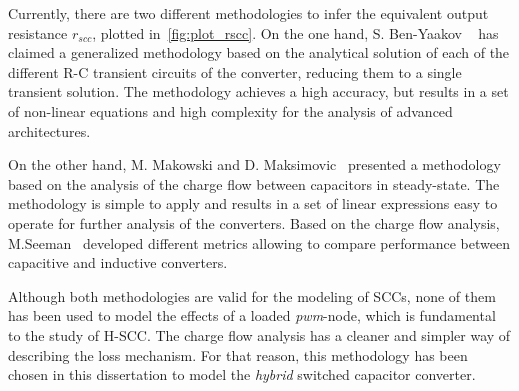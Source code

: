 Currently, there are two different methodologies to infer the equivalent output resistance $r_{scc}$, plotted in~\ref{fig:plot_rscc}. On the one hand, S. Ben-Yaakov  ~\cite{2009Ben-Yaakov,2012Ben-Yaakov,2013Evzelman} has claimed a generalized methodology based on the analytical solution of each of the different R-C transient circuits of the converter, reducing them to a single transient solution. The methodology achieves a high accuracy, but results in a set of non-linear equations and high complexity for the analysis of advanced architectures.

On the other hand,  M. Makowski and D. Maksimovic~\cite{95Makowski} presented a methodology based on the analysis of the charge flow between capacitors in steady-state. The methodology is simple to apply and results in a set of linear expressions easy to operate for further analysis of the converters. Based on the charge flow analysis, M.Seeman~\cite{Seeman:EECS-2009-78} developed different metrics allowing to compare performance between capacitive and inductive converters.

Although both methodologies are valid for the modeling of SCCs, none of them has been used to model the effects of a loaded \emph{pwm}-node, which is fundamental to the study of H-SCC.  The charge flow analysis has a cleaner and simpler way of describing the loss mechanism. For that reason, this methodology has been chosen in this dissertation to model the \emph{hybrid} switched capacitor converter.

